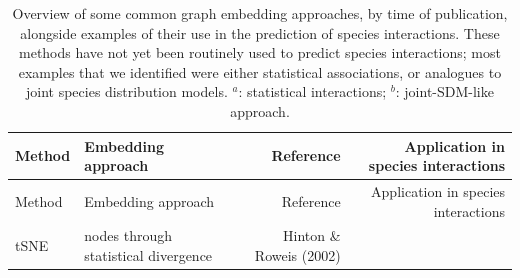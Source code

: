 \documentclass[11pt]{article}
\begin{document}
\hypertarget{tbl:methods}{}
\begin{longtable}[]{@{}llrr@{}}
\caption{\label{tbl:methods}Overview of some common graph embedding
approaches, by time of publication, alongside examples of their use in
the prediction of species interactions. These methods have not yet been
routinely used to predict species interactions; most examples that we
identified were either statistical associations, or analogues to joint
species distribution models. \(^a\): statistical interactions; \(^b\):
joint-SDM-like approach.}\tabularnewline
\toprule
\begin{minipage}[b]{0.11\columnwidth}\raggedright
Method\strut
\end{minipage} & \begin{minipage}[b]{0.30\columnwidth}\raggedright
Embedding approach\strut
\end{minipage} & \begin{minipage}[b]{0.16\columnwidth}\raggedleft
Reference\strut
\end{minipage} & \begin{minipage}[b]{0.32\columnwidth}\raggedleft
Application in species interactions\strut
\end{minipage}\tabularnewline
\midrule
\endfirsthead
\toprule
\begin{minipage}[b]{0.11\columnwidth}\raggedright
Method\strut
\end{minipage} & \begin{minipage}[b]{0.30\columnwidth}\raggedright
Embedding approach\strut
\end{minipage} & \begin{minipage}[b]{0.16\columnwidth}\raggedleft
Reference\strut
\end{minipage} & \begin{minipage}[b]{0.32\columnwidth}\raggedleft
Application in species interactions\strut
\end{minipage}\tabularnewline
\midrule
\endhead
\begin{minipage}[t]{0.11\columnwidth}\raggedright
tSNE\strut
\end{minipage} & \begin{minipage}[t]{0.30\columnwidth}\raggedright
nodes through statistical divergence\strut
\end{minipage} & \begin{minipage}[t]{0.16\columnwidth}\raggedleft
Hinton \& Roweis (2002)\strut
\end{minipage} & \begin{minipage}[t]{0.32\columnwidth}\raggedleft

\end{minipage}
\end{longtable}
\end{document}
